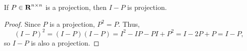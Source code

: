 \documentclass{homework}
\begin{document}
	\maketitle
	
	\question
	
	\question If $P \in \textnormal{\bf R}^{n\times n}$ is a projection, then $I-P$ is projection.
	\begin{proof}
		Since $P$ is a projection, $P^2 = P$. Thus,
		\begin{equation*}
			(I-P)^2 = (I-P)(I-P) = I^2 - IP - PI + P^2 = I - 2P + P = I - P,
		\end{equation*}
		so $I-P$ is also a projection.
	\end{proof}
	
	\question
	
	\question
	
	\question
	
\end{document}
